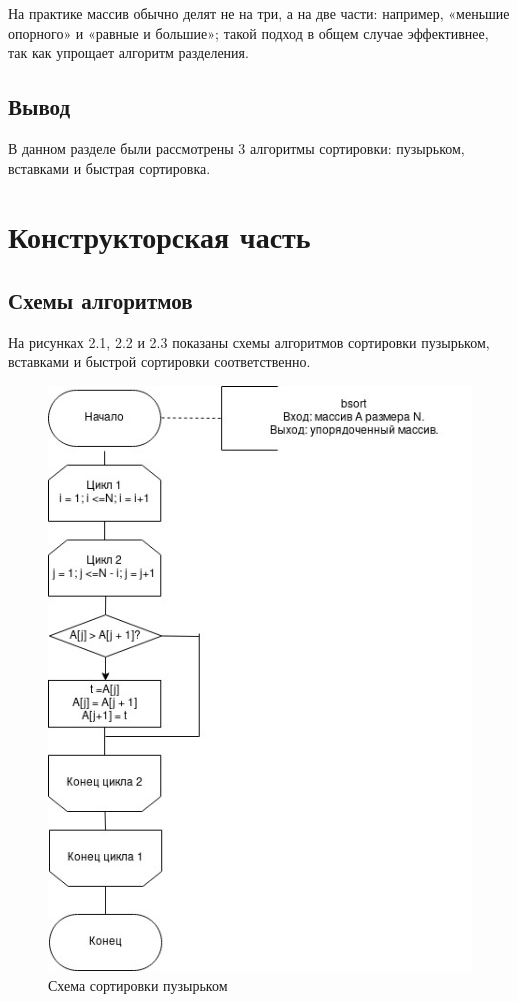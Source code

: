 \documentclass[12pt]{report}
\begin{document}
На практике массив обычно делят не на три, а на две части: например, «меньшие опорного» и «равные и большие»; такой подход в общем случае эффективнее, так как упрощает алгоритм разделения.

\section{Вывод}

В данном разделе были рассмотрены 3 алгоритмы сортировки: пузырьком, вставками и быстрая сортировка.
	
\clearpage

\chapter{Конструкторская часть}

\section{Схемы алгоритмов}

На рисунках 2.1, 2.2 и 2.3 показаны схемы алгоритмов сортировки пузырьком, вставками и быстрой сортировки соответственно.

\begin{figure}[h]
	\centering
	\includegraphics[width=0.9\linewidth]{bsort.jpg}
	\caption{Схема сортировки пузырьком}
	\label{fig:mpr}
\end{figure}
\end{document}
